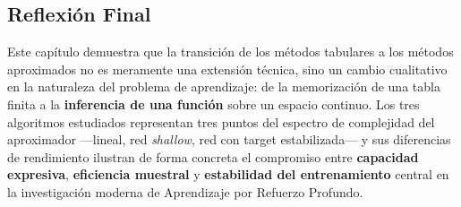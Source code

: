 \subsection{Reflexión Final}

Este capítulo demuestra que la transición de los métodos tabulares a los métodos aproximados no es meramente una extensión técnica, sino un cambio cualitativo en la naturaleza del problema de aprendizaje: de la memorización de una tabla finita a la \textbf{inferencia de una función} sobre un espacio continuo. Los tres algoritmos estudiados representan tres puntos del espectro de complejidad del aproximador ---lineal, red \textit{shallow}, red con target estabilizada--- y sus diferencias de rendimiento ilustran de forma concreta el compromiso entre \textbf{capacidad expresiva}, \textbf{eficiencia muestral} y \textbf{estabilidad del entrenamiento} central en la investigación moderna de Aprendizaje por Refuerzo Profundo.

